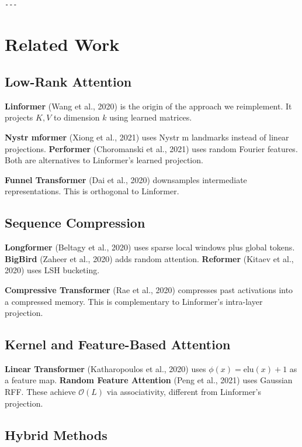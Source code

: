\begin{lstlisting}

---
\end{lstlisting}

\section{Related Work}

\subsection{Low-Rank Attention}

\textbf{Linformer} (Wang et al., 2020) is the origin of the approach we 
reimplement. It projects $K, V$ to dimension $k$ using learned matrices.

\textbf{Nystr mformer} (Xiong et al., 2021) uses Nystr m landmarks instead of 
linear projections. \textbf{Performer} (Choromanski et al., 2021) uses random 
Fourier features. Both are alternatives to Linformer's learned projection.

\textbf{Funnel Transformer} (Dai et al., 2020) downsamples intermediate 
representations. This is orthogonal to Linformer.

\subsection{Sequence Compression}

\textbf{Longformer} (Beltagy et al., 2020) uses sparse local windows plus global 
tokens. \textbf{BigBird} (Zaheer et al., 2020) adds random attention. 
\textbf{Reformer} (Kitaev et al., 2020) uses LSH bucketing.

\textbf{Compressive Transformer} (Rae et al., 2020) compresses past activations 
into a compressed memory. This is complementary to Linformer's intra-layer 
projection.

\subsection{Kernel and Feature-Based Attention}

\textbf{Linear Transformer} (Katharopoulos et al., 2020) uses $\phi(x) = \text{elu}(x)+1$ 
as a feature map. \textbf{Random Feature Attention} (Peng et al., 2021) uses 
Gaussian RFF. These achieve $\mathcal{O}(L)$ via associativity, different 
from Linformer's projection.

\subsection{Hybrid Methods}

